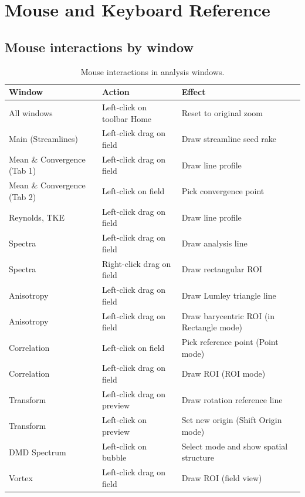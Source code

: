 \documentclass[11pt, a4paper]{report}
\begin{document}
\chapter{Mouse and Keyboard Reference}

\section{Mouse interactions by window}

\begin{table}[htbp]
\centering
\caption{Mouse interactions in analysis windows.}
\begin{tabular}{lp{4cm}p{6.5cm}}
\toprule
\textbf{Window} & \textbf{Action} & \textbf{Effect} \\
\midrule
All windows       & Left-click on toolbar Home & Reset to original zoom \\
Main (Streamlines) & Left-click drag on field & Draw streamline seed rake \\
Mean \& Convergence (Tab 1) & Left-click drag on field & Draw line profile \\
Mean \& Convergence (Tab 2) & Left-click on field & Pick convergence point \\
Reynolds, TKE     & Left-click drag on field & Draw line profile \\
Spectra           & Left-click drag on field & Draw analysis line \\
Spectra           & Right-click drag on field & Draw rectangular ROI \\
Anisotropy        & Left-click drag on field & Draw Lumley triangle line \\
Anisotropy        & Left-click drag on field & Draw barycentric ROI (in Rectangle mode) \\
Correlation       & Left-click on field & Pick reference point (Point mode) \\
Correlation       & Left-click drag on field & Draw ROI (ROI mode) \\
Transform         & Left-click drag on preview & Draw rotation reference line \\
Transform         & Left-click on preview & Set new origin (Shift Origin mode) \\
DMD Spectrum      & Left-click on bubble & Select mode and show spatial structure \\
Vortex            & Left-click drag on field & Draw ROI (field view) \\
\bottomrule
\end{tabular}
\end{table}
\end{document}

